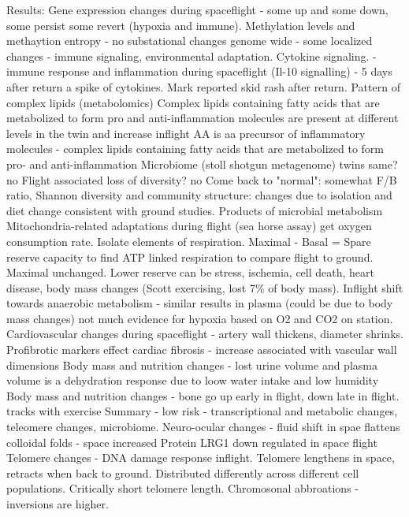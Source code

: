 \documentclass[a4paper, 11pt]{article}
\begin{document}
    Results: Gene expression changes during spaceflight - some up and some down, some persist some revert (hypoxia and immune). Methylation levels and methaytion entropy - no substational changes genome wide - some localized changes - immune signaling, environmental adaptation. 
    Cytokine signaling. - immune response and inflammation during spaceflight (Il-10 signalling)   - 5 days after return a spike of cytokines. Mark reported skid rash after return. 
    Pattern of complex lipids (metabolomics) Complex lipids containing fatty acids that are metabolized to form pro and anti-inflammation molecules are present at different levels in the twin and increase inflight 
    AA is aa precursor of inflammatory molecules - complex lipids containing fatty acids that are metabolized to form pro- and anti-inflammation
    Microbiome (stoll shotgun metagenome) twins same? no Flight associated loss of diversity? no Come back to "normal": somewhat 
    F/B ratio, Shannon diversity and community structure: changes due to isolation and diet change consistent with ground studies. 
    Products of microbial metabolism 
    Mitochondria-related adaptations during flight (sea horse assay) get oxygen consumption rate. Isolate elements of respiration. Maximal - Basal = Spare reserve capacity to find ATP linked respiration  to compare flight to ground.  Maximal unchanged. Lower reserve can be stress, ischemia, cell death, heart disease, body mass changes (Scott exercising, lost 7\% of body mass). 
    Inflight shift towards anaerobic metabolism - similar results in plasma (could be due to body mass changes) not much evidence for hypoxia based on O2 and CO2 on station. 
    Cardiovascular changes during spaceflight - artery wall thickens, diameter shrinks. Profibrotic markers effect cardiac fibrosis - increase associated with vascular wall dimensions
    Body mass and nutrition changes - lost urine volume and plasma volume is a dehydration response due to loow water intake and low humidity
    Body mass and nutrition changes - bone go up early in flight, down late in flight. tracks with exercise
    Summary - low risk - transcriptional and metabolic changes, teleomere changes, microbiome. 
    Neuro-ocular changes - fluid shift in spae flattens colloidal folds - space increased Protein LRG1 down regulated in space flight 
    Telomere changes - DNA damage response inflight. Telomere lengthens in space, retracts when back to ground. Distributed differently across different cell populations. Critically short telomere length. Chromosonal abbroations - inversions are higher. 
    
\end{document}
